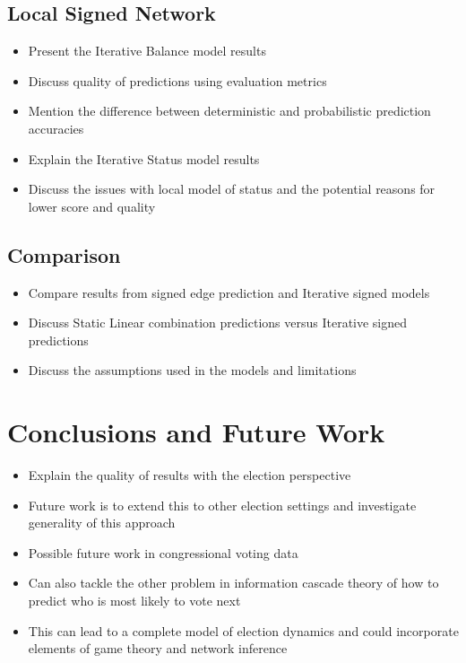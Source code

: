 \section{Local Signed Network}
\begin{itemize}
    \item Present the Iterative Balance model results
    \item Discuss quality of predictions using evaluation metrics
    \item Mention the difference between deterministic and probabilistic prediction accuracies
    \item Explain the Iterative Status model results 
    \item Discuss the issues with local model of status and the potential reasons for lower score and quality
\end{itemize}
\section{Comparison}
\begin{itemize}
    \item Compare results from signed edge prediction and Iterative signed models
    \item Discuss Static Linear combination predictions versus Iterative signed predictions 
    \item Discuss the assumptions used in the models and limitations 
\end{itemize}

\chapter{Conclusions and Future Work}
\label{chp:conclusion}
\begin{itemize}
    \item Explain the quality of results with the election perspective
    \item Future work is to extend this to other election settings and investigate generality of this approach
    \item Possible future work in congressional voting data
    \item Can also tackle the other problem in information cascade theory of how to predict who is most likely to vote next 
    \item This can lead to a complete model of election dynamics and could incorporate elements of game theory and network inference 
\end{itemize}

